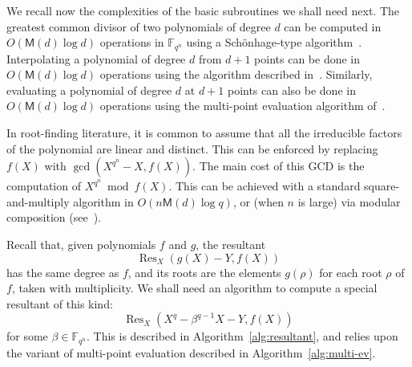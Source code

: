 \documentclass{sig-alternate}
\newcommand{\ff}[1]{\mathbb{F}_{#1}}
\newcommand{\dd}{d}
\newcommand{\qq}{q}
\newcommand{\nn}{n}
\newcommand{\qn}{{\qq^\nn}}
\newcommand{\extf}{\ff{\qn}}
\newcommand{\bigO}{O}
\newcommand{\Mul}{\mathsf{M}}
\DeclareMathOperator{\Res}{Res}
\newcounter{algo}
\newcommand{\todo}[1]{\textcolor{red}{TODO: #1}}
\renewcommand{\paragraph}[1]{\smallskip\noindent{{\bf \rm #1.}}}
\begin{document}
\paragraph{Fundamental algorithms}
%
%
We recall now the complexities of the basic subroutines we shall need next.
%
The greatest common divisor of two polynomials of degree $\dd$ can be computed in $\bigO(\Mul(\dd)\log \dd)$ operations in $\extf$ using a Sch\"on\-hage-type algorithm~\cite{Schoenhage1971,Thull1990}.
%
Interpolating a polynomial of degree $\dd$ from $\dd+1$ points can be done in $O(\Mul(\dd)\log\dd)$ operations using the algorithm described in~\cite[Ch. 10]{Gathen2003}. Similarly, evaluating a polynomial of degree $\dd$ at $\dd+1$ points can also be done in $\bigO(\Mul(\dd)\log \dd)$ operations using the multi-point evaluation algorithm of~\cite[Ch. 10]{Gathen2003}.

In root-finding literature, it is common to assume that all the irreducible factors of the polynomial are linear and distinct. This can be enforced by replacing $f(X)$ with $\gcd(X^\qn-X,f(X))$. The main cost of this GCD is the computation of $X^\qn\bmod f(X)$. This can be achieved with a standard square-and-multiply algorithm in $O(\nn\Mul(\dd)\log q)$, or (when $\nn$ is large) via modular composition (see~\cite{GathenS92,Kedlaya11}). 




Recall that, given polynomials $f$ and $g$, the resultant
$$\Res_X(g(X)-Y,f(X))$$
has the same degree as $f$, and its roots are the elements $g(\rho)$
for each root $\rho$ of $f$, taken with multiplicity. We shall need an
algorithm to compute a special resultant of this kind:
$$\Res_X(X^\qq-\beta^{\qq-1}X-Y,f(X))$$
for some $\beta\in\extf$. This is described in
Algorithm~\ref{alg:resultant}, and relies upon the variant of
multi-point evaluation described in Algorithm~\ref{alg:multi-ev}.
\end{document}
